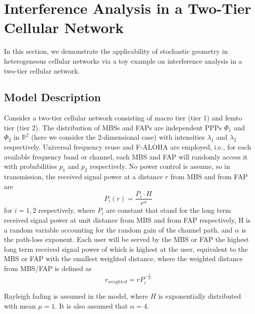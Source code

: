 \documentclass[a4paper,twocolumn]{IEEEtran}
\begin{document}
\section{Interference Analysis in a Two-Tier Cellular Network}\label{Sec:Int}
In this section, we demonstrate the applicability of stochastic geometry in heterogeneous cellular networks via a toy example on interference analysis in a two-tier cellular network.
\subsection{Model Description}
Consider a two-tier cellular network consisting of macro tier (tier 1) and femto tier (tier 2). The distribution of MBSs and FAPs are independent PPPs $\Phi_1$ and $\Phi_2$ in $\mathbb{R}^2$ (here we consider the 2-dimensional case) with intensities $\lambda_1$ and $\lambda_2$ respectively. Universal frequency reuse and F-ALOHA are employed, i.e., for each available frequency band or channel, each MBS and FAP will randomly access it with probabilities $p_1$ and $p_2$ respectively. No power control is assume, so in transmission, the received signal power at a distance $r$ from MBS and from FAP are
\begin{equation}
P_i(r)=\frac{P_i \cdot H}{r^\alpha} 
\end{equation}
for $i=1, 2$ respectively, where $P_i$ are constant that stand for the long term received signal power at unit distance from MBS and from FAP respectively, H is a random variable accounting for the random gain of the channel path, and $\alpha$ is the path-loss exponent. Each user will be served by the MBS or FAP the highest long term received signal power of which is highest at the user, equivalent to the MBS or FAP with the smallest weighted distance, where the weighted distance from MBS/FAP is defined as
\begin{equation}
r_{weighted}=r P_i^{-\frac{1}{\alpha}}
\end{equation}

Rayleigh fading is assumed in the model, where $H$ is exponentially distributed with mean $\mu = 1$. It is also assumed that $\alpha = 4$.
\end{document}
